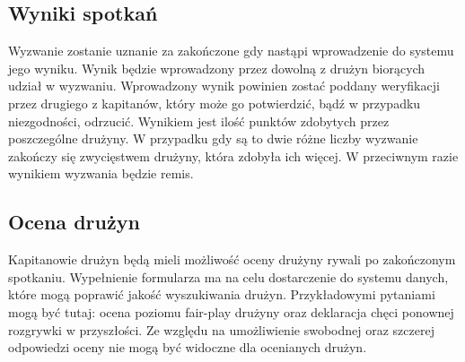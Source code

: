\subsection{Wyniki spotkań}

Wyzwanie zostanie uznanie za zakończone gdy nastąpi wprowadzenie do systemu jego wyniku. Wynik będzie wprowadzony przez dowolną z drużyn biorących udział w wyzwaniu. Wprowadzony wynik powinien zostać poddany weryfikacji przez drugiego z kapitanów, który może go potwierdzić, bądź w przypadku niezgodności, odrzucić. Wynikiem jest ilość punktów zdobytych przez poszczególne drużyny. W przypadku gdy są to dwie różne liczby wyzwanie zakończy się zwycięstwem drużyny, która zdobyła ich więcej. W przeciwnym razie wynikiem wyzwania będzie remis.

\subsection{Ocena drużyn}

Kapitanowie drużyn będą mieli możliwość oceny drużyny rywali po zakończonym spotkaniu. Wypełnienie formularza ma na celu dostarczenie do systemu danych, które mogą poprawić jakość wyszukiwania drużyn. Przykładowymi pytaniami mogą być tutaj: ocena poziomu fair-play drużyny oraz deklaracja chęci ponownej rozgrywki w przyszłości. Ze względu na umożliwienie swobodnej oraz szczerej odpowiedzi oceny nie mogą być widoczne dla ocenianych drużyn.
